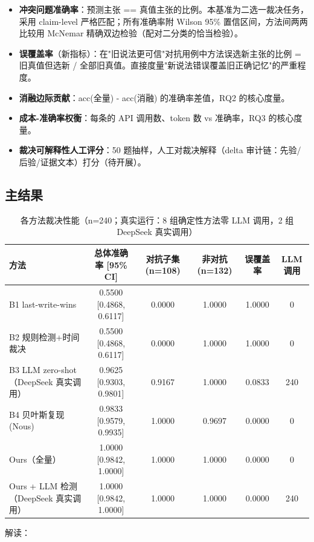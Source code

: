 \documentclass{article}
\begin{document}
\begin{itemize}
\item \textbf{冲突问题准确率}：预测主张 == 真值主张的比例。本基准为二选一裁决任务，采用 claim-level 严格匹配；所有准确率附 Wilson 95\% 置信区间，方法间两两比较用 McNemar 精确双边检验（配对二分类的恰当检验）。
\item \textbf{误覆盖率}（新指标）：在"旧说法更可信"对抗用例中方法误选新主张的比例 = 旧真值但选新 / 全部旧真值。直接度量"新说法错误覆盖旧正确记忆"的严重程度。
\item \textbf{消融边际贡献}：acc(全量) - acc(消融) 的准确率差值，RQ2 的核心度量。
\item \textbf{成本-准确率权衡}：每条的 API 调用数、token 数 vs 准确率，RQ3 的核心度量。
\item \textbf{裁决可解释性人工评分}：50 题抽样，人工对裁决解释（delta 审计链：先验/后验/证据文本）打分（待开展）。
\end{itemize}

\subsection{主结果}

\begin{table}[t]
\centering
{\small
\begin{tabular}{lccccc}
\toprule
方法 & 总体准确率 [95\% CI] & 对抗子集 (n=108) & 非对抗 (n=132) & 误覆盖率 & LLM 调用 \\
\midrule
B1 last-write-wins & 0.5500 [0.4868, 0.6117] & 0.0000 & 1.0000 & 1.0000 & 0 \\
B2 规则检测+时间裁决 & 0.5500 [0.4868, 0.6117] & 0.0000 & 1.0000 & 1.0000 & 0 \\
B3 LLM zero-shot（DeepSeek 真实调用） & 0.9625 [0.9303, 0.9801] & 0.9167 & 1.0000 & 0.0833 & 240 \\
B4 贝叶斯复现 (Nous) & 0.9833 [0.9579, 0.9935] & 1.0000 & 0.9697 & 0.0000 & 0 \\
Ours（全量） & 1.0000 [0.9842, 1.0000] & 1.0000 & 1.0000 & 0.0000 & 0 \\
Ours + LLM 检测（DeepSeek 真实调用） & 1.0000 [0.9842, 1.0000] & 1.0000 & 1.0000 & 0.0000 & 240 \\
\bottomrule
\end{tabular}
}
\caption{各方法裁决性能（n=240；真实运行：8 组确定性方法零 LLM 调用，2 组 DeepSeek 真实调用）}
\label{tab:main-results}
\end{table}


解读：
\end{document}
